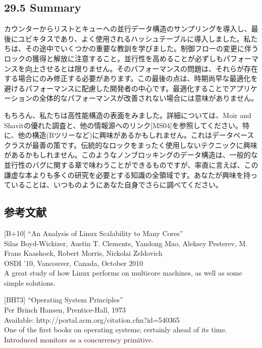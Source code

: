 \hypertarget{summary-18}{%
\subsection*{29.5 Summary}\label{summary-18}}

カウンターからリストとキューへの並行データ構造のサンプリングを導入し、最後にユビキタスであり、よく使用されるハッシュテーブルに導入しました。私たちは、その途中でいくつかの重要な教訓を学びました。制御フローの変更に伴うロックの獲得と解放に注意すること。並行性を高めることが必ずしもパフォーマンスを向上させるとは限りません。そのパフォーマンスの問題は、それらが存在する場合にのみ修正する必要があります。この最後の点は、時期尚早な最適化を避けるパフォーマンスに配慮した開発者の中心です。最適化することでアプリケーションの全体的なパフォーマンスが改善されない場合には意味がありません。

もちろん、私たちは高性能構造の表面をみました。詳細については、Moir and
Shavitの優れた調査と、他の情報源へのリンク{[}MS04{]}を参照してください。特に、他の構造(Bツリーなど)に興味があるかもしれません。これはデータベースクラスが最善の策です。伝統的なロックをまったく使用しないテクニックに興味があるかもしれません。このようなノンブロッキングのデータ構造は、一般的な並行性のバグに関する章で味わうことができるものですが、率直に言えば、この謙虚な本よりも多くの研究を必要とする知識の全領域です。あなたが興味を持っていることは、いつものようにあなた自身でさらに調べてください。

\hypertarget{ux53c2ux8003ux6587ux732e-18}{%
\subsection*{参考文献}\label{ux53c2ux8003ux6587ux732e-18}}

{[}B+10{]} ``An Analysis of Linux Scalability to Many Cores''\\
Silas Boyd-Wickizer, Austin T. Clements, Yandong Mao, Aleksey Pesterev,
M. Frans Kaashoek, Robert Morris, Nickolai Zeldovich\\
OSDI '10, Vancouver, Canada, October 2010\\
A great study of how Linux performs on multicore machines, as well as
some simple solutions.

{[}BH73{]} ``Operating System Principles''\\
Per Brinch Hansen, Prentice-Hall, 1973\\
Available: http://portal.acm.org/citation.cfm?id=540365\\
One of the first books on operating systems; certainly ahead of its
time. Introduced monitors as a concurrency primitive.

